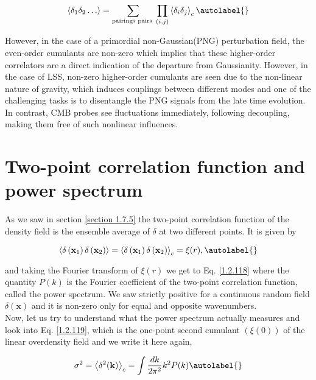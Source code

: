 \begin{equation}
    \left\langle\delta_{1} \delta_{2} \ldots\right\rangle=\sum_{\text {pairings pairs }} \prod_{(i, j)}\left\langle\delta_{i} \delta_{j}\right\rangle_{c} \autolabel{}
\end{equation}


However, in the case of a primordial non-Gaussian(PNG) perturbation field, the even-order cumulants are non-zero which implies that these higher-order correlators are a direct indication of the departure from Gaussianity. However, in the case of LSS, non-zero higher-order cumulants are seen due to the non-linear nature of gravity, which induces couplings between different modes and one of the challenging tasks is to disentangle the PNG signals from the late time evolution. In contrast, CMB probes see fluctuations immediately, following decoupling, making them free of such nonlinear influences.

\section{ Two-point correlation function and power spectrum}
 As we saw in section \ref{section 1.7.5} the two-point correlation function of the density field is the ensemble average of $\delta$ at two different points. It is given by


\begin{equation}
    \left\langle\delta\left(\mathbf{x}_{1}\right) \delta\left(\mathbf{x}_{2}\right)\right\rangle=\left\langle\delta\left(\mathbf{x}_{1}\right) \delta\left(\mathbf{x}_{2}\right)\right\rangle_{c}=\xi(r), \autolabel{}
\end{equation}

and taking the Fourier transform of $\xi(r)$ we get to Eq. \ref{1.2.118}
where the quantity $P(k)$ is the Fourier coefficient of the two-point correlation function, called the power spectrum. We saw strictly positive for a continuous random field  $\delta(\mathbf{x})$ and it is non-zero only for equal and opposite wavenumbers. \\


Now, let us try to understand what the power spectrum actually measures and look into Eq. \ref{1.2.119}, which is the one-point second cumulant $(\xi(0))$ of the linear overdensity field and we write it here again,


\begin{equation}
    \sigma^{2}=\left\langle\delta^{2}(\mathbf{k})\right\rangle_{c}=\int \frac{d k}{2 \pi^{2}} k^{2} P(k) \autolabel{}
\end{equation}


